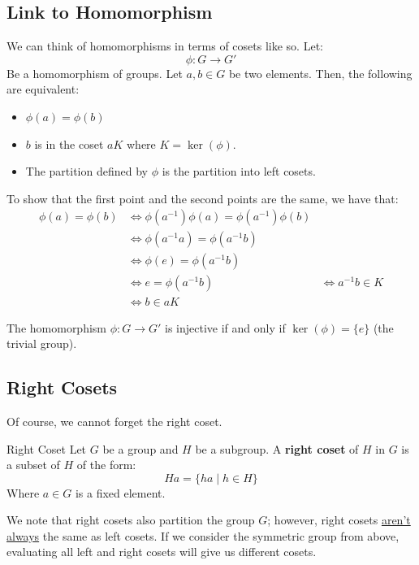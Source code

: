 \documentclass[letterpaper]{article}
\begin{document}
\subsection{Link to Homomorphism}
We can think of homomorphisms in terms of cosets like so. Let: 
\[\phi: G \to G'\]
Be a homomorphism of groups. Let $a, b \in G$ be two elements. Then, the following are equivalent: 
\begin{itemize}
    \item $\phi(a) = \phi(b)$
    \item $b$ is in the coset $aK$ where $K = \ker(\phi)$. 
    \item The partition defined by $\phi$ is the partition into left cosets. 
\end{itemize}
To show that the first point and the second points are the same, we have that: 
\begin{equation*}
    \begin{aligned}
        \phi(a) = \phi(b) &\iff \phi(a^{-1}) \phi(a) = \phi(a^{-1}) \phi(b) \\ 
            &\iff \phi(a^{-1}a) = \phi(a^{-1}b) \\ 
            &\iff \phi(e) = \phi(a^{-1} b) \\ 
            &\iff e = \phi(a^{-1} b)
            &\iff a^{-1} b \in K \\ 
            &\iff b \in aK 
    \end{aligned}
\end{equation*}

\begin{corollary}{}{}
    The homomorphism $\phi: G \to G'$ is injective if and only if $\ker(\phi) = \{e\}$ (the trivial group). 
\end{corollary}


\subsection{Right Cosets}
Of course, we cannot forget the right coset. 
\begin{definition}{Right Coset}{}
    Let $G$ be a group and $H$ be a subgroup. A \textbf{right coset} of $H$ in $G$ is a subset of $H$ of the form:  
    \[Ha = \{ha \mid h \in H\}\]
    Where $a \in G$ is a fixed element. 
\end{definition}

We note that right cosets also partition the group $G$; however, right cosets \underline{aren't always} the same as left cosets. If we consider the symmetric group from above, evaluating all left and right cosets will give us different cosets. 
\end{document}
